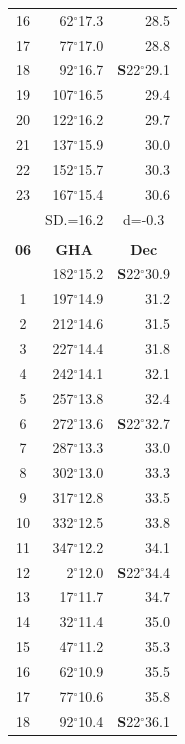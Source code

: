 \documentclass[10pt, a4paper]{report}
\begin{document}
\begin{scriptsize}
\begin{tabular*}{0.2\textwidth}[t]{@{\extracolsep{\fill}}|c|rr|}
16 & 62$^\circ$17.3 & 28.5\\
17 & 77$^\circ$17.0 & 28.8\\[2Pt]
18 & 92$^\circ$16.7 & \textbf{S}22$^\circ$29.1\\
19 & 107$^\circ$16.5 & 29.4\\
20 & 122$^\circ$16.2 & 29.7\\
21 & 137$^\circ$15.9 & \raisebox{0.24ex}{\boldmath$\cdot$~\boldmath$\cdot$~~}30.0\\
22 & 152$^\circ$15.7 & 30.3\\
23 & 167$^\circ$15.4 & 30.6\\
\hline
\rule{0pt}{2.4ex} & \multicolumn{1}{c}{SD.=16.2} & \multicolumn{1}{c|}{d=-0.3}\\
\hline
\multicolumn{1}{c}{}\\[-0.5ex]\hline
\multicolumn{1}{|c|}{\rule{0pt}{2.6ex}\textbf{06}} & \multicolumn{1}{c}{\textbf{GHA}} & \multicolumn{1}{c|}{\textbf{Dec}}\\
\hline\rule{0pt}{2.6ex}\noindent
0 & 182$^\circ$15.2 & \textbf{S}22$^\circ$30.9\\
1 & 197$^\circ$14.9 & 31.2\\
2 & 212$^\circ$14.6 & 31.5\\
3 & 227$^\circ$14.4 & \raisebox{0.24ex}{\boldmath$\cdot$~\boldmath$\cdot$~~}31.8\\
4 & 242$^\circ$14.1 & 32.1\\
5 & 257$^\circ$13.8 & 32.4\\[2Pt]
6 & 272$^\circ$13.6 & \textbf{S}22$^\circ$32.7\\
7 & 287$^\circ$13.3 & 33.0\\
8 & 302$^\circ$13.0 & 33.3\\
9 & 317$^\circ$12.8 & \raisebox{0.24ex}{\boldmath$\cdot$~\boldmath$\cdot$~~}33.5\\
10 & 332$^\circ$12.5 & 33.8\\
11 & 347$^\circ$12.2 & 34.1\\[2Pt]
12 & 2$^\circ$12.0 & \textbf{S}22$^\circ$34.4\\
13 & 17$^\circ$11.7 & 34.7\\
14 & 32$^\circ$11.4 & 35.0\\
15 & 47$^\circ$11.2 & \raisebox{0.24ex}{\boldmath$\cdot$~\boldmath$\cdot$~~}35.3\\
16 & 62$^\circ$10.9 & 35.5\\
17 & 77$^\circ$10.6 & 35.8\\[2Pt]
18 & 92$^\circ$10.4 & \textbf{S}22$^\circ$36.1\\

\end{tabular*}
\end{scriptsize}
\end{document}
